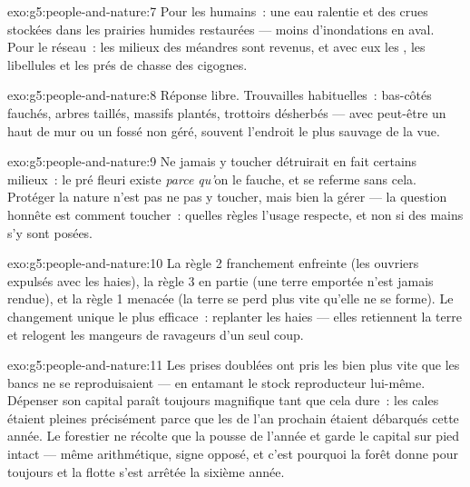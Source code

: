\begin{solution}{exo:g5:people-and-nature:7}
Pour les humains~: une eau ralentie et des crues stockées dans les
prairies humides restaurées --- moins d'inondations en aval. Pour le
réseau~: les milieux des méandres sont revenus, et avec eux les
, les libellules et les prés de chasse des cigognes.
\end{solution}

\begin{solution}{exo:g5:people-and-nature:8}
Réponse libre. Trouvailles habituelles~: bas-côtés fauchés, arbres
taillés, massifs plantés, trottoirs désherbés --- avec peut-être un
haut de mur ou un fossé non géré, souvent l'endroit le plus sauvage
de la vue.
\end{solution}

\begin{solution}{exo:g5:people-and-nature:9}
Ne jamais y toucher détruirait en fait certains milieux~: le pré
fleuri existe \emph{parce qu'}on le fauche, et se referme sans cela.
Protéger la nature n'est pas ne pas y toucher, mais bien la gérer
--- la question honnête est comment toucher~: quelles règles l'usage
respecte, et non si des mains s'y sont posées.
\end{solution}

\begin{solution}{exo:g5:people-and-nature:10}
La règle 2 franchement enfreinte (les ouvriers expulsés avec les
haies), la règle 3 en partie (une terre emportée n'est jamais
rendue), et la règle 1 menacée (la terre se perd plus vite qu'elle
ne se forme). Le changement unique le plus efficace~: replanter les
haies --- elles retiennent la terre et relogent les mangeurs de
ravageurs d'un seul coup.
\end{solution}

\begin{solution}{exo:g5:people-and-nature:11}
Les prises doublées ont pris les  bien plus vite que les
bancs ne se reproduisaient --- en entamant le stock reproducteur
lui-même. Dépenser son capital paraît toujours magnifique tant que
cela dure~: les cales étaient pleines précisément parce que les
 de l'an prochain étaient débarqués cette année. Le
forestier ne récolte que la pousse de l'année et garde le capital
sur pied intact --- même arithmétique, signe opposé, et c'est
pourquoi la forêt donne pour toujours et la flotte s'est arrêtée la
sixième année.
\end{solution}
